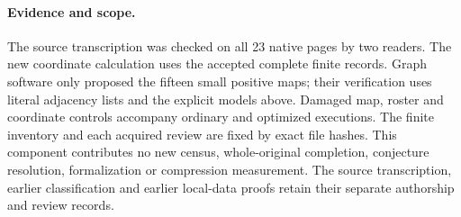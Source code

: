 \documentclass[10pt]{article}
\begin{document}
\paragraph{Evidence and scope.}
The source transcription was checked on all 23 native pages by two
readers. The new coordinate calculation uses the accepted complete
finite records. Graph software only proposed the fifteen small positive
maps; their verification uses literal adjacency lists and the explicit
models above. Damaged map, roster and coordinate controls accompany
ordinary and optimized executions. The finite inventory and each
acquired review are fixed by exact file hashes. This component contributes
no new census, whole-original completion, conjecture resolution,
formalization or compression measurement. The source transcription,
earlier classification and earlier local-data proofs retain their
separate authorship and review records.
\end{document}
